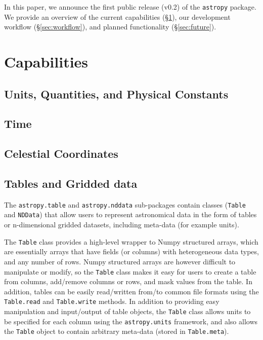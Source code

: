 \documentclass[12pt,preprint]{aastex}
\begin{document}
In this paper, we announce the first public release (v0.2) of the
\texttt{astropy} package. We provide an overview of the current capabilities
(\S\ref{sec:capabilities}), our development workflow (\S\ref{sec:workflow}),
and planned functionality (\S\ref{sec:future}).

\section{Capabilities}

\label{sec:capabilities}


\subsection{Units, Quantities, and Physical Constants}



\subsection{Time}



\subsection{Celestial Coordinates}



\subsection{Tables and Gridded data}


The \texttt{astropy.table} and \texttt{astropy.nddata} sub-packages contain
classes (\texttt{Table} and \texttt{NDData}) that allow users to represent
astronomical data in the form of tables or n-dimensional gridded datasets,
including meta-data (for example units).

The \texttt{Table} class provides a high-level wrapper to Numpy structured
arrays, which are essentially arrays that have fields (or columns) with
heterogeneous data types, and any number of rows. Numpy structured arrays are
however difficult to manipulate or modify, so the \texttt{Table} class makes
it easy for users to create a table from columns, add/remove columns or rows,
and mask values from the table. In addition, tables can be easily read/written
from/to common file formats using the \texttt{Table.read} and
\texttt{Table.write} methods. In addition to providing easy manipulation and
input/output of table objects, the \texttt{Table} class allows units to be
specified for each column using the \texttt{astropy.units} framework, and also
allows the \texttt{Table} object to contain arbitrary meta-data (stored in
\texttt{Table.meta}).
\end{document}
